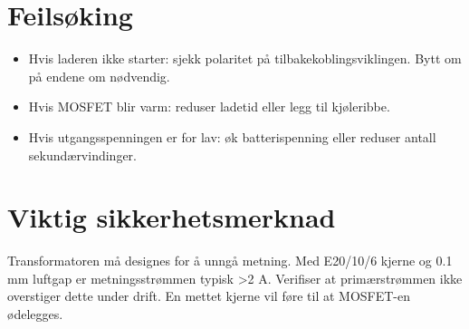 \documentclass{article}
\begin{document}
\section{Feilsøking}
\begin{itemize}
\item Hvis laderen ikke starter: sjekk polaritet på tilbakekoblingsviklingen. Bytt om på endene om nødvendig.
\item Hvis MOSFET blir varm: reduser ladetid eller legg til kjøleribbe.
\item Hvis utgangsspenningen er for lav: øk batterispenning eller reduser antall sekundærvindinger.
\end{itemize}

\section{Viktig sikkerhetsmerknad}
Transformatoren må designes for å unngå metning. Med E20/10/6 kjerne og 0.1 mm luftgap er metningsstrømmen typisk >2 A. Verifiser at primærstrømmen ikke overstiger dette under drift. En mettet kjerne vil føre til at MOSFET-en ødelegges.
\end{document}
